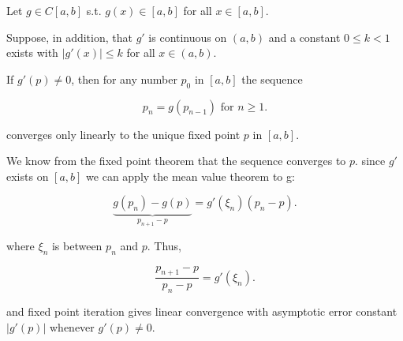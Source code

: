 Let $g\in C[a,b]$ s.t. $g(x) \in [a, b]$ for all $x \in [a, b]$.

Suppose, in addition, that $g'$ is continuous on $(a,b)$ and a constant
$0\leq k<1$ exists with $|g'(x)|\leq k$ for all $x\in (a,b)$.

If $g'(p) \neq 0$, then for any number $p_0$ in $[a,b]$ the sequence 

\[
  p_n = g(p_{n-1}) \text{ for } n\geq 1
.\]

converges only linearly to the unique fixed point $p$ in $[a,b]$.

\proof We know from the fixed point theorem that the sequence converges to $p$.
since $g'$ exists on $[a,b]$ we can apply the mean value theorem to g:

\[
\underbrace{g(p_n) - g(p)}_{p_{n+1} - p} = g'(\xi_n)(p_n - p)
.\]

where $\xi_n$ is between $p_n$ and $p$. Thus,

\[
  \frac{p_{n+1}-p}{p_n-p} = g'(\xi_n)
.\]

and fixed point iteration gives linear convergence with asymptotic error
constant $|g'(p)|$ whenever $g'(p) \neq 0$.

